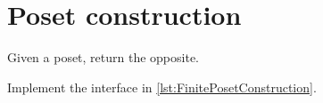 \section{\usebox{\chaptergear}
  Poset construction}

\begin{codeexercise}
    Given a poset, return the opposite.

    Implement the interface in \cref{lst:FinitePosetConstruction}.
\end{codeexercise}

